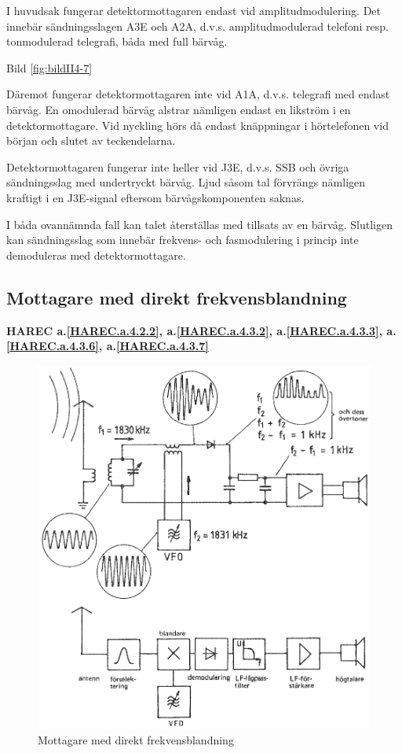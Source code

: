 I huvudsak fungerar detektormottagaren endast vid amplitudmodulering.
Det innebär sändningsslagen A3E och A2A, d.v.s. amplitudmodulerad telefoni
resp. tonmodulerad telegrafi, båda med full bärvåg.

Bild \ref{fig:bildII4-7}

Däremot fungerar detektormottagaren inte vid A1A, d.v.s. telegrafi med
endast bärvåg.
En omodulerad bärvåg alstrar nämligen endast en likström i en
detektormottagare.
Vid nyckling hörs då endast knäppningar i hörtelefonen vid början och
slutet av teckendelarna.

Detektormottagaren fungerar inte heller vid J3E, d.v.s. SSB och övriga
sändningsslag med undertryckt bärvåg.
Ljud såsom tal förvrängs nämligen kraftigt i en J3E-signal eftersom
bärvågskomponenten saknas.

I båda ovannämnda fall kan talet återställas med tillsats av en bärvåg.
Slutligen kan sändningsslag som innebär frekvens- och fasmodulering i
princip inte demoduleras med detektormottagare.

\subsection{Mottagare med direkt frekvensblandning}
\textbf{HAREC a.\ref{HAREC.a.4.2.2}\label{myHAREC.a.4.2.2},
a.\ref{HAREC.a.4.3.2}\label{myHAREC.a.4.3.2},
a.\ref{HAREC.a.4.3.3}\label{myHAREC.a.4.3.3},
a.\ref{HAREC.a.4.3.6}\label{myHAREC.a.4.3.6},
a.\ref{HAREC.a.4.3.7}\label{myHAREC.a.4.3.7}
}

\begin{figure}
  \includegraphics[width=\textwidth]{images/cropped_pdfs/bild_2_4-08.pdf}
  \caption{Mottagare med direkt frekvensblandning}
  \label{fig:bildII4-8}
\end{figure}

